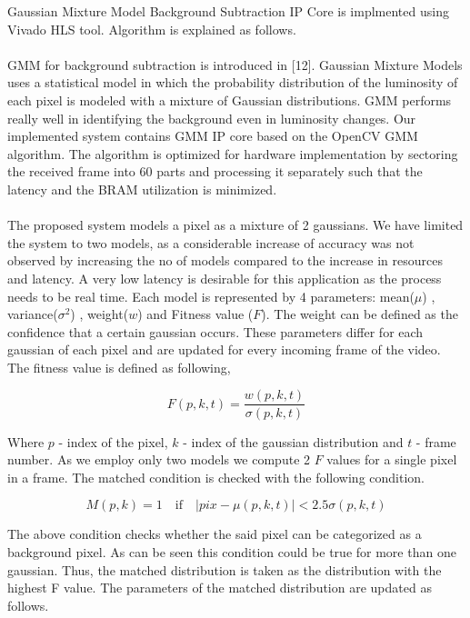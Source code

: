 \documentclass[12pt,a4paper]{report}
\begin{document}
Gaussian Mixture Model Background Subtraction IP Core is implmented using Vivado HLS tool. Algorithm is explained as follows.\\\\ GMM for background subtraction is introduced in [12].
Gaussian Mixture Models uses a statistical model in which the probability distribution of the luminosity of each pixel is modeled with a mixture of Gaussian distributions. GMM performs really well in identifying the background even in luminosity changes. Our implemented system contains GMM IP core based on the OpenCV GMM algorithm.  The algorithm is optimized for hardware implementation by sectoring the received frame into 60 parts and processing it separately such that the latency and the BRAM utilization is minimized.\\\\
The proposed system models a pixel as a mixture of 2 gaussians. We have limited the system to two models, as a considerable increase of accuracy was not observed by increasing the no of models compared to the increase in resources and latency. A very low latency is desirable for this application as the process needs to be real time. Each model is represented by 4 parameters: mean($\mu$) , variance($\sigma^2$) , weight($w$) and Fitness value ($F$). The weight can be defined as the confidence that a certain gaussian occurs. These parameters differ for each gaussian of each pixel and are updated for every incoming frame of the video.\\
The fitness value is defined as following,

\begin{equation}
F(p,k,t)=\frac{w(p,k,t)}{\sigma(p,k,t)}
\end{equation}

Where $p$ - index of the pixel, $k$ - index of the gaussian distribution and $t$ - frame number. As we employ only two models we compute 2 $F$ values for a single pixel in a frame. The matched condition is checked with the following condition. 

\begin{equation}
M(p,k)=1 \quad \textrm{if}  \quad |pix- \mu(p,k,t)| < 2.5\sigma(p,k,t)
\end{equation}

The above condition checks whether the said pixel can be categorized as a background pixel. As can be seen this condition could be true for more than one gaussian. Thus, the matched distribution is taken as the distribution with the highest F value. The parameters of the matched distribution are updated as follows. 
\end{document}
